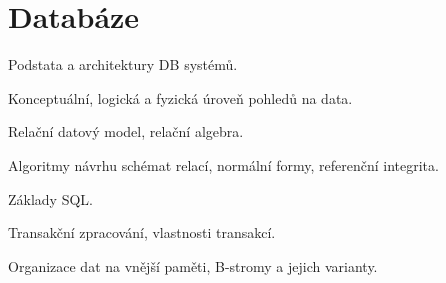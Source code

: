 \section{Databáze}
\begin{pozadavky}
\begin{pitemize}
\item Podstata a architektury DB systémů.
\item Konceptuální, logická a fyzická úroveň pohledů na data.
\item Relační datový model, relační algebra.
\item Algoritmy návrhu schémat relací, normální formy, referenční integrita.
\item Základy SQL.
\item Transakční zpracování, vlastnosti transakcí.
\item Organizace dat na vnější paměti, B-stromy a jejich varianty.
\end{pitemize}
\end{pozadavky}








